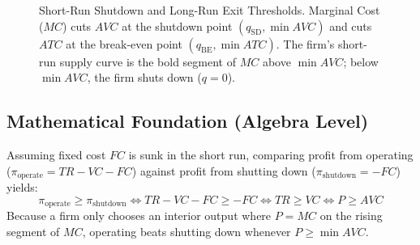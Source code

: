 \documentclass[11pt,letterpaper]{article}
\begin{document}
\begin{figure}[htbp]
\caption{Short-Run Shutdown and Long-Run Exit Thresholds. Marginal Cost ($MC$) cuts $AVC$ at the shutdown point $(q_{\text{SD}}, \min AVC)$ and cuts $ATC$ at the break-even point $(q_{\text{BE}}, \min ATC)$. The firm's short-run supply curve is the bold segment of $MC$ above $\min AVC$; below $\min AVC$, the firm shuts down ($q=0$).}
\label{fig:shutdown_exit}
\end{figure}

\subsection*{Mathematical Foundation (Algebra Level)}
Assuming fixed cost $FC$ is sunk in the short run, comparing profit from operating ($\pi_{\text{operate}} = TR - VC - FC$) against profit from shutting down ($\pi_{\text{shutdown}} = -FC$) yields:
\begin{equation}
\pi_{\text{operate}} \ge \pi_{\text{shutdown}} \iff TR - VC - FC \ge -FC \iff TR \ge VC \iff P \ge AVC
\end{equation}
Because a firm only chooses an interior output where $P = MC$ on the rising segment of $MC$, operating beats shutting down whenever $P \ge \min AVC$.
\end{document}
